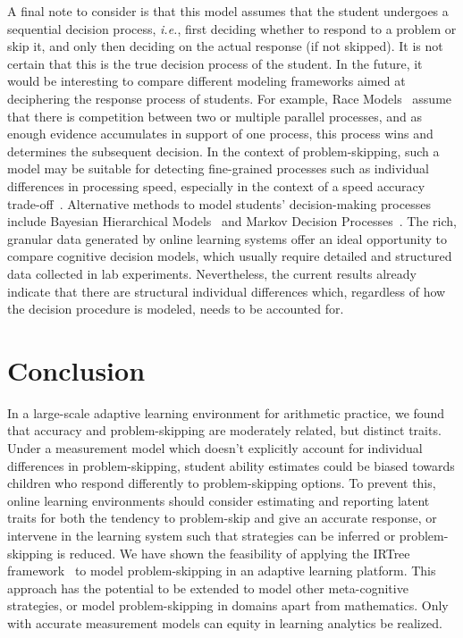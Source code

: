 \documentclass[11pt]{article}
\begin{document}
A final note to consider is that this model assumes that the student undergoes a sequential decision process, \textit{i.e.}, first deciding whether to respond to a problem or skip it, and only then deciding on the actual response (if not skipped). It is not certain that this is the true decision process of the student. In the future, it would be interesting to compare different modeling frameworks aimed at deciphering the response process of students. For example, Race Models~\parencite{heathcote2022winner} assume that there is competition between two or multiple parallel processes, and as enough evidence accumulates in support of one process, this process wins and determines the subsequent decision. In the context of problem-skipping, such a model may be suitable for detecting fine-grained processes such as individual differences in processing speed, especially in the context of a speed accuracy trade-off~\parencite{heathcote2022winner, evans2018modeling}. Alternative methods to model students' decision-making processes include Bayesian Hierarchical Models~\parencite{sawyer2018modeling, lee2014bayesian} and Markov Decision Processes~\parencite{lamar2018markov, puterman1994markov}. The rich, granular data generated by online learning systems offer an ideal opportunity to compare cognitive decision models, which usually require detailed and structured data collected in lab experiments. Nevertheless, the current results already indicate that there are structural individual differences which, regardless of how the decision procedure is modeled, needs to be accounted for.

\section{Conclusion}
In a large-scale adaptive learning environment for arithmetic practice, we found that accuracy and problem-skipping are moderately related, but distinct traits. Under a measurement model which doesn't explicitly account for individual differences in problem-skipping, student ability estimates could be biased towards children who respond differently to problem-skipping options. To prevent this, online learning environments should consider estimating and reporting latent traits for both the tendency to problem-skip and give an accurate response, or intervene in the learning system such that strategies can be inferred or problem-skipping is reduced. We have shown the feasibility of applying the IRTree framework~\parencite{de2012irtrees} to model problem-skipping in an adaptive learning platform. This approach has the potential to be extended to model other meta-cognitive strategies, or model problem-skipping in domains apart from mathematics. Only with accurate measurement models can equity in learning analytics be realized. 
\end{document}
